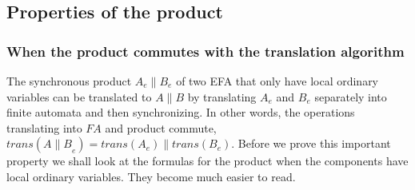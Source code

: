 \documentclass{article}
\begin{document}
\subsection{Properties of the product}



\subsubsection{When the product commutes with the translation algorithm}

The synchronous product $A_e\|B_e$ of two EFA that only have local ordinary
variables can be translated to $A\|B$ by translating
$A_e$ and $B_e$ separately into finite automata and then
synchronizing. In other words, the operations translating into
$FA$ and product commute, $trans({A\|B}_e) =trans(A_e)\|trans(B_e)$.
Before we prove this important property we shall look at the formulas
 for the product when the components have local ordinary variables.
 They become much easier to read.
\end{document}
